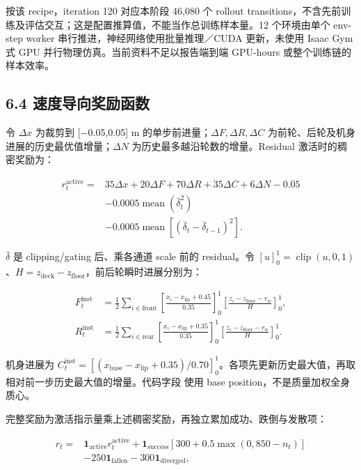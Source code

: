 \documentclass[
  10pt,
  a4paper,
]{article}
\begin{document}
按该 recipe，iteration 120 对应本阶段 46,080 个 rollout
transitions，不含先前训练及评估交互；这是配置推算值，不能当作总训练样本量。12
个环境由单个 env-step worker 串行推进，神经网络使用批量推理／CUDA
更新，未使用 Isaac Gym 式 GPU 并行物理仿真。当前资料不足以报告端到端
GPU-hours 或整个训练链的样本效率。

\subsection{6.4
速度导向奖励函数}\label{ux901fux5ea6ux5bfcux5411ux5956ux52b1ux51fdux6570}

令 \(\Delta x\) 为裁剪到 {[}−0.05,0.05{]} m
的单步前进量；\(\Delta F,\Delta R,\Delta C\)
为前轮、后轮及机身进展的历史最优值增量；\(\Delta N\)
为历史最多越沿轮数的增量。Residual 激活时的稠密奖励为：

\[
\begin{aligned}
r_t^{\mathrm{active}}={}&35\Delta x+20\Delta F+70\Delta R+35\Delta C+6\Delta N-0.05\\
&-0.0005\operatorname{mean}(\bar\delta_t^2)\\
&-0.0005\operatorname{mean}[(\bar\delta_t-\bar\delta_{t-1})^2].
\end{aligned}
\]

\(\bar\delta\) 是 clipping/gating 后、乘各通道 scale 前的 residual。令
\([u]_0^1=\operatorname{clip}(u,0,1)\)、\(H=z_{\mathrm{deck}}-z_{\mathrm{floor}}\)，前后轮瞬时进展分别为：

\[
\begin{aligned}
F_t^{\mathrm{inst}}&=\frac12\sum_{i\in\mathrm{front}}\left[\frac{x_i-x_{\mathrm{lip}}+0.45}{0.35}\right]_0^1\left[\frac{z_i-z_{\mathrm{floor}}-r_w}{H}\right]_0^1,\\
R_t^{\mathrm{inst}}&=\frac12\sum_{i\in\mathrm{rear}}\left[\frac{x_i-x_{\mathrm{lip}}+0.35}{0.35}\right]_0^1\left[\frac{z_i-z_{\mathrm{floor}}-r_w}{H}\right]_0^1.
\end{aligned}
\]

机身进展为
\(C_t^{\mathrm{inst}}=[(x_{\mathrm{base}}-x_{\mathrm{lip}}+0.35)/0.70]_0^1\)。各项先更新历史最大值，再取相对前一步历史最大值的增量。代码字段
{\ttfamily\small{}} 使用 base
position，不是质量加权全身质心。

完整奖励为激活指示量乘上述稠密奖励，再独立累加成功、跌倒与发散项：

\[
\begin{aligned}
r_t={}&\mathbf1_{\mathrm{active}}r_t^{\mathrm{active}}
+\mathbf1_{\mathrm{success}}[300+0.5\max(0,850-n_t)]\\
&-250\mathbf1_{\mathrm{fallen}}-300\mathbf1_{\mathrm{diverged}},
\end{aligned}
\]
\end{document}
